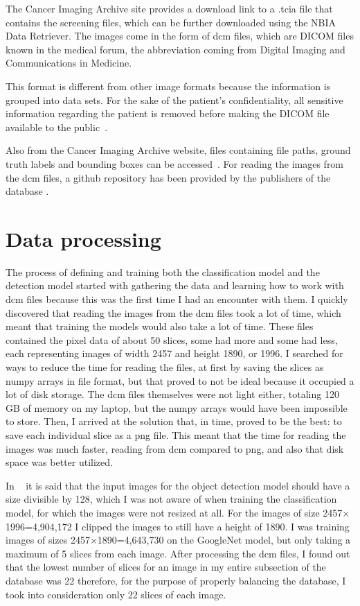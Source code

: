 The Cancer Imaging Archive site provides a download link to a .tcia file that contains the screening files, which can be further downloaded using the NBIA Data Retriever. The images come in the form of dcm files, which are DICOM files known in the medical forum, the abbreviation coming from Digital Imaging and Communications in Medicine.

This format is different from other image formats because the information is grouped into data sets. For the sake of the patient's confidentiality, all sensitive information regarding the patient is removed before making the DICOM file available to the public~\cite{carte6}.

Also from the Cancer Imaging Archive website, files containing file paths, ground truth labels and bounding boxes can be accessed~\cite{carte7}. For reading the images from the dcm files, a github repository has been provided by the publishers of the data\-base \cite{link5}.

\section{Data processing}

The process of defining and training both the classification model and the detection model started with gathering the data and learning how to work with dcm files because this was the first time I had an encounter with them. I quickly discovered that reading the images from the dcm files took a lot of time, which meant that training the models would also take a lot of time. These files contained the pixel data of about 50 slices, some had more and some had less, each representing images of width 2457 and height 1890, or 1996. I searched for ways to reduce the time for reading the files, at first by saving the slices as numpy arrays in file format, but that proved to not be ideal because it occupied a lot of disk storage. The dcm files themselves were not light either, totaling 120 GB of memory on my laptop, but the numpy arrays would have been impossible to store. Then, I arrived at the solution that, in time, proved to be the best: to save each individual slice as a png file. This meant that the time for reading the images was much faster, reading from dcm compared to png, and also that disk space was better utilized.

In ~\cite{carte8} it is said that the input images for the object detection model should have a size divisible by 128, which I was not aware of when training the classification model, for which the images were not resized at all. For the images of size 2457$\times$1996=4,904,172 I clipped the images to still have a height of 1890. I was training images of sizes 2457$\times$1890=4,643,730 on the GoogleNet model, but only taking a maximum of 5 slices from each image. After processing the dcm files, I found out that the lowest number of slices for an image in my entire subsection of the database was 22 therefore, for the purpose of properly balancing the database, I took into consideration only 22 slices of each image. 
 
